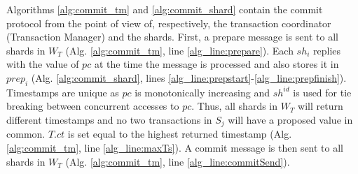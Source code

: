 \documentclass[sigconf, nonacm]{acmart}
\begin{document}
\begin{algorithm}
	\label{alg:commit_shard}
\end{algorithm}

Algorithms \ref{alg:commit_tm} and \ref{alg:commit_shard} contain the commit protocol from the point of view of, respectively, the transaction coordinator (Transaction Manager) and the shards.
First, a prepare message is sent to all shards in $W_T$ (Alg. \ref{alg:commit_tm}, line \ref{alg_line:prepare}).
Each $\mathit{sh}_i$ replies with the value of $\mathit{pc}$ at the time the message is processed and also stores it in $\mathit{prep}_i$ (Alg. \ref{alg:commit_shard}, lines \ref{alg_line:prepstart}-\ref{alg_line:prepfinish}).
Timestamps are unique as $\mathit{pc}$ is monotonically increasing and $\mathit{sh^{id}}$ is used for tie breaking between concurrent accesses to $\mathit{pc}$.
Thus, all shards in $W_T$ will return different timestamps and no two transactions in $S_j$ will have a proposed value in common.
$\mathit{T.ct}$ is set equal to the highest returned timestamp (Alg. \ref{alg:commit_tm}, line \ref{alg_line:maxTs}).
A commit message is then sent to all shards in $W_T$ (Alg. \ref{alg:commit_tm}, line \ref{alg_line:commitSend}).
\end{document}
